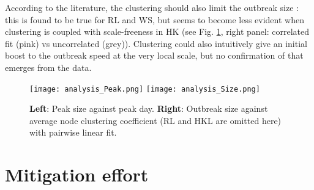 \documentclass[DIV=12, BCOR=0pt]{scrartcl}  %
\begin{document}
  According to the literature, the clustering should also limit the outbreak size \citep{PastorSatorras}: this is found to be true for RL and WS, but seems to become less evident when clustering is coupled with scale-freeness in HK (see Fig. \ref{fig:analysis}, right panel: correlated fit (pink) vs uncorrelated (grey)). 
  Clustering could also intuitively give an initial boost to the outbreak speed at the very local scale, but no confirmation of that emerges from the data.
  

	\begin{figure}[h]
		\centering
		\texttt{[image: analysis\_Peak.png]}
		\texttt{[image: analysis\_Size.png]}
		\caption{\textbf{Left}: Peak size against peak day. %
			\textbf{Right}: Outbreak size against average node clustering coefficient (RL and HKL are omitted here) with pairwise linear fit.}
		\label{fig:analysis}
	\end{figure}
  

	\section{Mitigation effort}
	\label{sec:miti}
	
\end{document}
